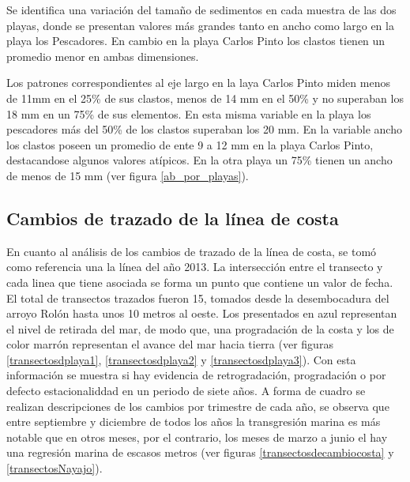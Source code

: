 \documentclass[11pt,]{article}
\begin{document}
Se identifica una variación del tamaño de sedimentos en cada muestra de
las dos playas, donde se presentan valores más grandes tanto en ancho
como largo en la playa los Pescadores. En cambio en la playa Carlos
Pinto los clastos tienen un promedio menor en ambas dimensiones.

Los patrones correspondientes al eje largo en la laya Carlos Pinto miden
menos de 11mm en el 25\% de sus clastos, menos de 14 mm en el 50\% y no
superaban los 18 mm en un 75\% de sus elementos. En esta misma variable
en la playa los pescadores más del 50\% de los clastos superaban los 20
mm. En la variable ancho los clastos poseen un promedio de ente 9 a 12
mm en la playa Carlos Pinto, destacandose algunos valores atípicos. En
la otra playa un 75\% tienen un ancho de menos de 15 mm (ver figura
\ref{ab_por_playas}).

\subsection{Cambios de trazado de la línea de
costa}\label{cambios-de-trazado-de-la-luxednea-de-costa}

En cuanto al análisis de los cambios de trazado de la línea de costa, se
tomó como referencia una la línea del año 2013. La intersección entre el
transecto y cada linea que tiene asociada se forma un punto que contiene
un valor de fecha. El total de transectos trazados fueron 15, tomados
desde la desembocadura del arroyo Rolón hasta unos 10 metros al oeste.
Los presentados en azul representan el nivel de retirada del mar, de
modo que, una progradación de la costa y los de color marrón representan
el avance del mar hacia tierra (ver figuras \ref{transectosdplaya1},
\ref{transectosdplaya2} y \ref{transectosdplaya3}). Con esta información
se muestra si hay evidencia de retrogradación, progradación o por
defecto estacionaliddad en un periodo de siete años. A forma de cuadro
se realizan descripciones de los cambios por trimestre de cada año, se
observa que entre septiembre y diciembre de todos los años la
transgresión marina es más notable que en otros meses, por el contrario,
los meses de marzo a junio el hay una regresión marina de escasos metros
(ver figuras \ref{transectosdecambiocosta} y \ref{transectosNayajo}).
\end{document}
